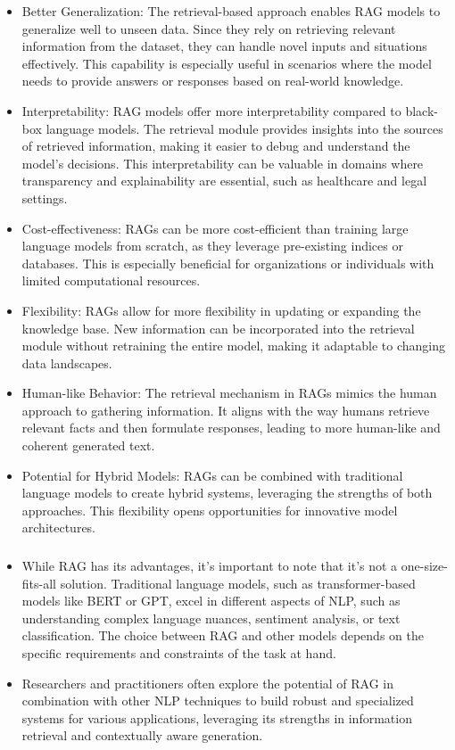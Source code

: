 \documentclass[../main.tex]{subfiles}
\begin{document}
\begin{itemize}
	\item{Better Generalization: The retrieval-based approach enables RAG models to generalize well to unseen data. Since they rely on retrieving relevant information from the dataset, they can handle novel inputs and situations effectively. This capability is especially useful in scenarios where the model needs to provide answers or responses based on real-world knowledge.}
	\item{Interpretability: RAG models offer more interpretability compared to black-box language models. The retrieval module provides insights into the sources of retrieved information, making it easier to debug and understand the model's decisions. This interpretability can be valuable in domains where transparency and explainability are essential, such as healthcare and legal settings.}
	\item{Cost-effectiveness: RAGs can be more cost-efficient than training large language models from scratch, as they leverage pre-existing indices or databases. This is especially beneficial for organizations or individuals with limited computational resources.}
	\item{Flexibility: RAGs allow for more flexibility in updating or expanding the knowledge base. New information can be incorporated into the retrieval module without retraining the entire model, making it adaptable to changing data landscapes.}
	\item{Human-like Behavior: The retrieval mechanism in RAGs mimics the human approach to gathering information. It aligns with the way humans retrieve relevant facts and then formulate responses, leading to more human-like and coherent generated text.}
	\item{Potential for Hybrid Models: RAGs can be combined with traditional language models to create hybrid systems, leveraging the strengths of both approaches. This flexibility opens opportunities for innovative model architectures.}
\end{itemize}
\subsubsection{\color{red}{Note}}

\begin{itemize}
	\item While RAG has its advantages, it's important to note that it's not a one-size-fits-all solution. Traditional language models, such as transformer-based models like \gls{BERT} or \gls{GPT}, excel in different aspects of NLP, such as understanding complex language nuances, sentiment analysis, or text classification. The choice between RAG and other models depends on the specific requirements and constraints of the task at hand.
	\item Researchers and practitioners often explore the potential of RAG in combination with other NLP techniques to build robust and specialized systems for various applications, leveraging its strengths in information retrieval and contextually aware generation.
\end{itemize}
\end{document}
